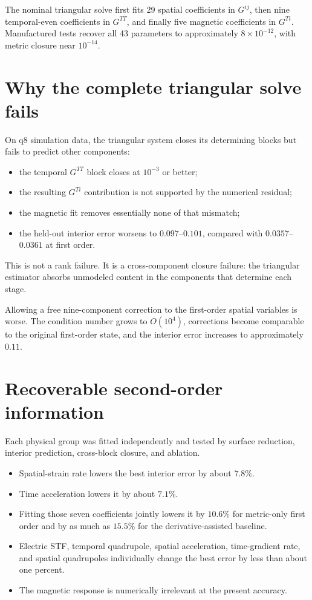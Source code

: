 \documentclass[11pt]{article}
\begin{document}
The nominal triangular solve first fits 29 spatial coefficients in
\(G^{ij}\), then nine temporal-even coefficients in \(G^{TT}\), and finally
five magnetic coefficients in \(G^{Ti}\).  Manufactured tests recover all 43
parameters to approximately \(8\times10^{-12}\), with metric closure near
\(10^{-14}\).

\section{Why the complete triangular solve fails}

On q8 simulation data, the triangular system closes its determining blocks
but fails to predict other components:

\begin{itemize}
  \item the temporal \(G^{TT}\) block closes at \(10^{-3}\) or better;
  \item the resulting \(G^{Ti}\) contribution is not supported by the
        numerical residual;
  \item the magnetic fit removes essentially none of that mismatch;
  \item the held-out interior error worsens to \(0.097\)--\(0.101\),
        compared with \(0.0357\)--\(0.0361\) at first order.
\end{itemize}

This is not a rank failure.  It is a cross-component closure failure: the
triangular estimator absorbs unmodeled content in the components that
determine each stage.

Allowing a free nine-component correction to the first-order spatial
variables is worse.  The condition number grows to \(O(10^4)\), corrections
become comparable to the original first-order state, and the interior error
increases to approximately \(0.11\).

\section{Recoverable second-order information}

Each physical group was fitted independently and tested by surface
reduction, interior prediction, cross-block closure, and ablation.

\begin{itemize}
  \item Spatial-strain rate lowers the best interior error by about
        \(7.8\%\).
  \item Time acceleration lowers it by about \(7.1\%\).
  \item Fitting those seven coefficients jointly lowers it by \(10.6\%\) for
        metric-only first order and by as much as \(15.5\%\) for the
        derivative-assisted baseline.
  \item Electric STF, temporal quadrupole, spatial acceleration,
        time-gradient rate, and spatial quadrupoles individually change the
        best error by less than about one percent.
  \item The magnetic response is numerically irrelevant at the present
        accuracy.
\end{itemize}
\end{document}

